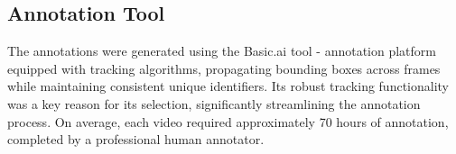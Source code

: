\subsection{Annotation Tool}
The annotations were generated using the Basic.ai tool - annotation platform equipped with tracking algorithms, propagating bounding boxes across frames while maintaining consistent unique identifiers. Its robust tracking functionality was a key reason for its selection, significantly streamlining the annotation process. On average, each video required approximately 70 hours of annotation, completed by a professional human annotator.